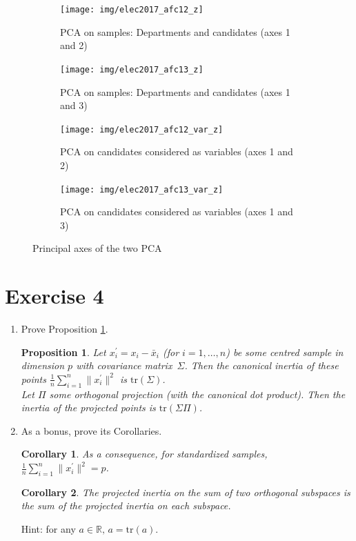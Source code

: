 \documentclass[
  11pt,
  a4paper,
]{article}
\newcommand{\R}{\mathbb R}
\newtheorem{corollary}{Corollary}
\newtheorem{proposition}{Proposition}
\begin{document}
\begin{figure}[htp]
  \centering
  \begin{subfigure}[b]{0.47\textwidth}
    \texttt{[image: img/elec2017\_afc12\_z]}
     \caption{PCA on samples: Departments and  candidates (axes 1 and 2)}
     \label{fig:elec2017:axis12}
  \end{subfigure}
  \hspace{5pt}
  \begin{subfigure}[b]{0.47\textwidth}
    \texttt{[image: img/elec2017\_afc13\_z]}
    \caption{PCA on samples: Departments and  candidates (axes 1 and 3)}
     \label{fig:elec2017:axis13}
  \end{subfigure}
  \begin{subfigure}[b]{0.47\textwidth}
    \texttt{[image: img/elec2017\_afc12\_var\_z]}
     \caption{PCA on candidates considered as variables (axes 1 and 2)}
     \label{fig:elec2017:axis12:var}
  \end{subfigure}
  \hspace{5pt}
  \begin{subfigure}[b]{0.47\textwidth}
    \texttt{[image: img/elec2017\_afc13\_var\_z]}
    \caption{PCA on candidates considered as variables (axes 1 and 3)}
     \label{fig:elec2017:axis13:var}
  \end{subfigure}
  \caption{Principal axes of the two PCA}
\end{figure}

\hypertarget{exercise-4}{%
\section{Exercise 4}\label{exercise-4}}

\begin{enumerate}
\item Prove Proposition \ref{theo:inertia_projection}. 
\begin{proposition}
    Let $x^\prime_i = x_i - {\bar x}_i$ (for $i=1,\ldots,n$) be some centred sample in dimension $p$ with covariance matrix~$\Sigma$. Then the canonical inertia of these points ${\displaystyle{\frac{1}{n}\sum\limits_{i=1}^n \|x^\prime_i\|^2}}$ is ${\mbox{tr}}(\Sigma)$.\\
    Let $\Pi$ some orthogonal projection (with the canonical dot product). Then the inertia of the projected points is ${\mbox{tr}}(\Sigma \Pi)$.
    \label{theo:inertia_projection}
\end{proposition}
\item As a bonus, prove its Corollaries.
\begin{corollary}
    As a consequence, for standardized samples, ${\displaystyle{\frac{1}{n}\sum\limits_{i=1}^n \|x^\prime_i\|^2}} = p$.
\end{corollary} 
\begin{corollary}
    The projected inertia on the sum of two orthogonal subspaces is the sum of the projected inertia on each subspace.
\end{corollary} 
Hint: for any $a \in \R,\, a = {\mbox{tr}}(a)$.
\end{enumerate}
\end{document}
